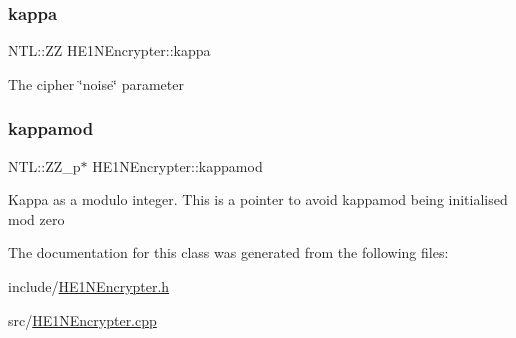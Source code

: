 \subsubsection{\texorpdfstring{kappa}{kappa}}
{\footnotesize\ttfamily N\+T\+L\+::\+ZZ H\+E1\+N\+Encrypter\+::kappa\hspace{0.3cm}{\ttfamily [private]}}

The cipher \char`\"{}noise\char`\"{} parameter \mbox{\label{classHE1NEncrypter_ae878596c30bc5825c3366366bf2b07fc}} 
\subsubsection{\texorpdfstring{kappamod}{kappamod}}
{\footnotesize\ttfamily N\+T\+L\+::\+Z\+Z\+\_\+p$\ast$ H\+E1\+N\+Encrypter\+::kappamod\hspace{0.3cm}{\ttfamily [private]}}

Kappa as a modulo integer. This is a pointer to avoid kappamod being initialised mod zero 

The documentation for this class was generated from the following files\+:\begin{DoxyCompactItemize}
\item 
include/\hyperlink{HE1NEncrypter_8h}{H\+E1\+N\+Encrypter.\+h}\item 
src/\hyperlink{HE1NEncrypter_8cpp}{H\+E1\+N\+Encrypter.\+cpp}\end{DoxyCompactItemize}
